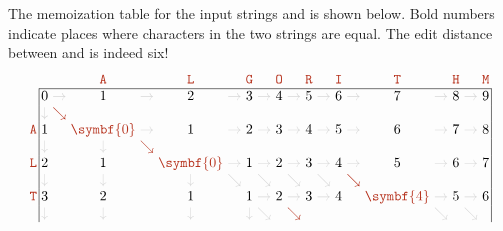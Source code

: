The memoization table for the input strings  and  is shown below.
Bold numbers indicate places where characters in the two strings are equal.
The edit distance between  and  is indeed six!
\[
\setlength{\arraycolsep}{1.5pt}
\begin{array}{r|ccccccccccccccccccc|}
\multicolumn{1}{r}{} &  &  & \mbox{\Str{A}} &  & \mbox{\Str{L}} &  & \mbox{\Str{G}} &  & \mbox{\Str{O}} &  & \mbox{\Str{R}} &  & \mbox{\Str{I}} &  & \mbox{\Str{T}} &  & \mbox{\Str{H}} &  & \multicolumn{1}{c}{\mbox{\Str{M}}}\\
\cline{2-20}
 & 0 & \color{JEgray}\rightarrow & 1 & \color{JEgray}\rightarrow & 2 & \color{JEgray}\rightarrow & 3 & \color{JEgray}\rightarrow & 4 & \color{JEgray}\rightarrow & 5 & \color{JEgray}\rightarrow & 6 & \color{JEgray}\rightarrow & 7 & \color{JEgray}\rightarrow & 8 & \color{JEgray}\rightarrow & 9\\
 & \color{JEgray}\downarrow & \color{JEred}\searrow &  &  &  &  &  &  &  &  &  &  &  &  &  &  &  &  & \\
\mbox{\Str{A}} & 1 &  & \color{JEred}\symbf{0} & \color{JEgray}\rightarrow & 1 & \color{JEgray}\rightarrow & 2 & \color{JEgray}\rightarrow & 3 & \color{JEgray}\rightarrow & 4 & \color{JEgray}\rightarrow & 5 & \color{JEgray}\rightarrow & 6 & \color{JEgray}\rightarrow & 7 & \color{JEgray}\rightarrow & 8\\
 & \color{JEgray}\downarrow &  & \color{JEgray}\downarrow & \color{JEred}\searrow &  &  &  &  &  &  &  &  &  &  &  &  &  &  & \\
\mbox{\Str{L}} & 2 &  & 1 &  & \color{JEred}\symbf{0} & \color{JEgray}\rightarrow & 1 & \color{JEgray}\rightarrow & 2 & \color{JEgray}\rightarrow & 3 & \color{JEgray}\rightarrow & 4 & \color{JEgray}\rightarrow & 5 & \color{JEgray}\rightarrow & 6 & \color{JEgray}\rightarrow & 7\\
 & \color{JEgray}\downarrow &  & \color{JEgray}\downarrow &  & \color{JEgray}\downarrow & \color{JEgray}\searrow &  & \color{JEgray}\searrow &  & \color{JEgray}\searrow &  & \color{JEgray}\searrow &  & \color{JEred}\searrow &  &  &  &  & \\
\mbox{\Str{T}} & 3 &  & 2 &  & 1 &  & 1 & \color{JEgray}\rightarrow & 2 & \color{JEgray}\rightarrow & 3 & \color{JEgray}\rightarrow & 4 &  & \color{JEred}\symbf{4} & \color{JEgray}\rightarrow & 5 & \color{JEgray}\rightarrow & 6\\
 & \color{JEgray}\downarrow &  & \color{JEgray}\downarrow &  & \color{JEgray}\downarrow &  & \color{JEgray}\downarrow & \color{JEgray}\searrow &  & \color{JEred}\searrow &  &  &  &  &  & \color{JEgray}\searrow &  & \color{JEgray}\searrow & \\

\end{array}\]
